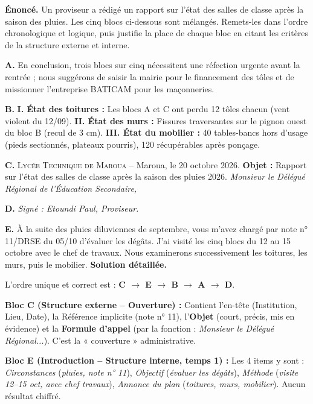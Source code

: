 \documentclass[11pt]{article}
\begin{document}
\begin{exoresolu}
\textbf{Énoncé.} Un proviseur a rédigé un rapport sur l'état des salles de classe après la saison des pluies. Les cinq blocs ci-dessous sont mélangés. Remets-les dans l'ordre chronologique et logique, puis justifie la place de chaque bloc en citant les critères de la structure externe et interne.\par
\textbf{A.} En conclusion, trois blocs sur cinq nécessitent une réfection urgente avant la rentrée ; nous suggérons de saisir la mairie pour le financement des tôles et de missionner l'entreprise BATICAM pour les maçonneries.\par
\textbf{B.} \textbf{I. État des toitures :} Les blocs A et C ont perdu 12 tôles chacun (vent violent du 12/09). \textbf{II. État des murs :} Fissures traversantes sur le pignon ouest du bloc B (recul de 3 cm). \textbf{III. État du mobilier :} 40 tables-bancs hors d'usage (pieds sectionnés, plateaux pourris), 120 récupérables après ponçage.\par
\textbf{C.} \textsc{Lycée Technique de Maroua} -- Maroua, le 20 octobre 2026. \textbf{Objet :} Rapport sur l'état des salles de classe après la saison des pluies 2026. \emph{Monsieur le Délégué Régional de l'Éducation Secondaire,}\par
\textbf{D.} \emph{Signé : Etoundi Paul, Proviseur.}\par
\textbf{E.} À la suite des pluies diluviennes de septembre, vous m'avez chargé par note n° 11/DRSE du 05/10 d'évaluer les dégâts. J'ai visité les cinq blocs du 12 au 15 octobre avec le chef de travaux. Nous examinerons successivement les toitures, les murs, puis le mobilier.
\tcblower
\textbf{Solution détaillée.}\par
L'ordre unique et correct est : \textbf{C $\rightarrow$ E $\rightarrow$ B $\rightarrow$ A $\rightarrow$ D}.\par
\noindent\textbf{Bloc C (Structure externe -- Ouverture) :} Contient l'en-tête (Institution, Lieu, Date), la Référence implicite (note n° 11), l'\textbf{Objet} (court, précis, mis en évidence) et la \textbf{Formule d'appel} (par la fonction : \emph{Monsieur le Délégué Régional...}). C'est la « couverture » administrative.\par
\noindent\textbf{Bloc E (Introduction -- Structure interne, temps 1) :} Les 4 items y sont : \emph{Circonstances} (\emph{pluies, note n° 11}), \emph{Objectif} (\emph{évaluer les dégâts}), \emph{Méthode} (\emph{visite 12--15 oct, avec chef travaux}), \emph{Annonce du plan} (\emph{toitures, murs, mobilier}). Aucun résultat chiffré.\par

\end{exoresolu}
\end{document}
